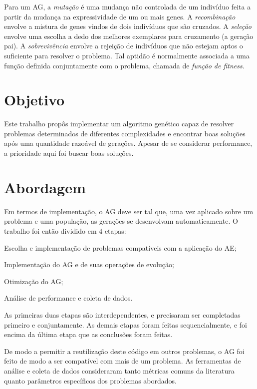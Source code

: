 Para um AG, a \emph{mutação} é uma mudança não controlada de um indivíduo feita a partir da mudança na expressividade de um ou mais genes. A \emph{recombinação} envolve a mistura de genes vindos de dois indivíduos que são cruzados. A \emph{seleção} envolve uma escolha a dedo dos melhores exemplares para cruzamento (a geração pai). A \emph{sobrevivência} envolve a rejeição de indivíduos que não estejam aptos o suficiente para resolver o problema. Tal aptidão é normalmente associada a uma função definida conjuntamente com o problema, chamada de \emph{função de fitness}.

\section{Objetivo}

Este trabalho propôs implementar um algoritmo genético capaz de resolver problemas determinados de diferentes complexidades e encontrar boas soluções após uma quantidade razoável de gerações. Apesar de se considerar performance, a prioridade aqui foi buscar boas soluções.

\section{Abordagem}

Em termos de implementação, o AG deve ser tal que, uma vez aplicado sobre um problema e uma população, as gerações se desenvolvam automaticamente. O trabalho foi então dividido em 4 etapas:

\begin{enumerate}[label={[\arabic*]}]
	\item Escolha e implementação de problemas compatíveis com a aplicação do AE;
	\item Implementação do AG e de suas operações de evolução;
	\item Otimização do AG;
	\item Análise de performance e coleta de dados.
\end{enumerate}

As primeiras duas etapas são interdependentes, e precisaram ser completadas primeiro e conjuntamente. As demais etapas foram feitas sequencialmente, e foi encima da última etapa que as conclusões foram feitas.

De modo a permitir a reutilização deste código em outros problemas, o AG foi feito de modo a ser compatível com mais de um problema. As ferramentas de análise e coleta de dados consideraram tanto métricas comuns da literatura quanto parâmetros específicos dos problemas abordados.

